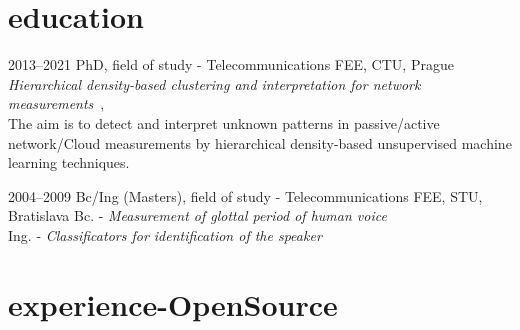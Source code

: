 \documentclass[]{friggeri-cv} %
\begin{document}
\section{education}
\begin{entrylist}

\entry
{2013--2021}
{PhD, field of study - Telecommunications}
{FEE, CTU, Prague}
{\emph{Hierarchical density-based clustering and interpretation for network measurements}~\cite{nof}, \cite{wtmc}\\
The aim is to detect and interpret unknown patterns in passive/active network/Cloud measurements by hierarchical density-based unsupervised machine learning techniques.}



\entry
{2004--2009}
{Bc/Ing (Masters), field of study - Telecommunications}
{FEE, STU, Bratislava}
{Bc. - \emph{Measurement of glottal period of human voice}\\Ing. - \emph{Classificators for identification of the speaker}~\cite{kacur2011speaker}}

\end{entrylist}

\vspace{-1em}

\section{experience-OpenSource}
\end{document}
